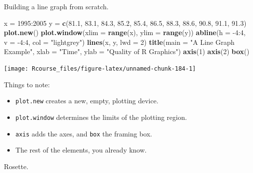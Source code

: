 \documentclass[]{book}
\newenvironment{Shaded}{\begin{snugshade}}{\end{snugshade}}
\newcommand{\KeywordTok}[1]{\textcolor[rgb]{0.13,0.29,0.53}{\textbf{{#1}}}}
\newcommand{\DataTypeTok}[1]{\textcolor[rgb]{0.13,0.29,0.53}{{#1}}}
\newcommand{\DecValTok}[1]{\textcolor[rgb]{0.00,0.00,0.81}{{#1}}}
\newcommand{\FloatTok}[1]{\textcolor[rgb]{0.00,0.00,0.81}{{#1}}}
\newcommand{\StringTok}[1]{\textcolor[rgb]{0.31,0.60,0.02}{{#1}}}
\newcommand{\NormalTok}[1]{{#1}}
\providecommand{\tightlist}{%
  \setlength{\itemsep}{0pt}\setlength{\parskip}{0pt}}
\theoremstyle{definition}
\theoremstyle{definition}
\theoremstyle{remark}
\begin{document}
Building a line graph from scratch.

\begin{Shaded}
\begin{Highlighting}[]
\NormalTok{x =}\StringTok{ }\DecValTok{1995}\NormalTok{:}\DecValTok{2005}
\NormalTok{y =}\StringTok{ }\KeywordTok{c}\NormalTok{(}\FloatTok{81.1}\NormalTok{, }\FloatTok{83.1}\NormalTok{, }\FloatTok{84.3}\NormalTok{, }\FloatTok{85.2}\NormalTok{, }\FloatTok{85.4}\NormalTok{, }\FloatTok{86.5}\NormalTok{, }\FloatTok{88.3}\NormalTok{, }\FloatTok{88.6}\NormalTok{, }\FloatTok{90.8}\NormalTok{, }\FloatTok{91.1}\NormalTok{, }\FloatTok{91.3}\NormalTok{)}
\KeywordTok{plot.new}\NormalTok{()}
\KeywordTok{plot.window}\NormalTok{(}\DataTypeTok{xlim =} \KeywordTok{range}\NormalTok{(x), }\DataTypeTok{ylim =} \KeywordTok{range}\NormalTok{(y))}
\KeywordTok{abline}\NormalTok{(}\DataTypeTok{h =} \NormalTok{-}\DecValTok{4}\NormalTok{:}\DecValTok{4}\NormalTok{, }\DataTypeTok{v =} \NormalTok{-}\DecValTok{4}\NormalTok{:}\DecValTok{4}\NormalTok{, }\DataTypeTok{col =} \StringTok{"lightgrey"}\NormalTok{)}
\KeywordTok{lines}\NormalTok{(x, y, }\DataTypeTok{lwd =} \DecValTok{2}\NormalTok{)}
\KeywordTok{title}\NormalTok{(}\DataTypeTok{main =} \StringTok{"A Line Graph Example"}\NormalTok{,}
        \DataTypeTok{xlab =} \StringTok{"Time"}\NormalTok{,}
        \DataTypeTok{ylab =} \StringTok{"Quality of R Graphics"}\NormalTok{)}
\KeywordTok{axis}\NormalTok{(}\DecValTok{1}\NormalTok{)}
\KeywordTok{axis}\NormalTok{(}\DecValTok{2}\NormalTok{)}
\KeywordTok{box}\NormalTok{()}
\end{Highlighting}
\end{Shaded}

\texttt{[image: Rcourse\_files/figure-latex/unnamed-chunk-184-1]}

Things to note:

\begin{itemize}
\tightlist
\item
  \texttt{plot.new} creates a new, empty, plotting device.
\item
  \texttt{plot.window} determines the limits of the plotting region.
\item
  \texttt{axis} adds the axes, and \texttt{box} the framing box.
\item
  The rest of the elements, you already know.
\end{itemize}

Rosette.
\end{document}
